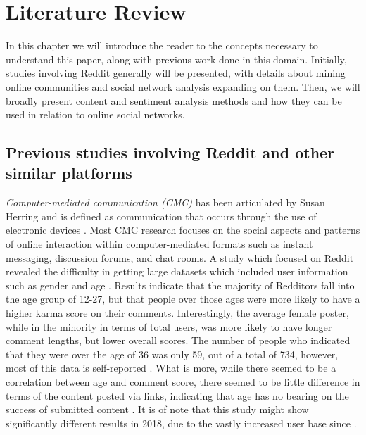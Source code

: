 \documentclass[bsc,frontabs,twoside,singlespacing,parskip,deptreport]{infthesis}
\begin{document}
\chapter{Literature Review}\label{background}
In this chapter we will introduce the reader to the concepts necessary to understand this paper, along with previous work done in this domain. Initially, studies involving Reddit generally will be presented, with details about mining online communities and social network analysis expanding on them. Then, we will broadly present content and sentiment analysis methods and how they can be used in relation to online social networks.

\section{Previous studies involving Reddit and other similar platforms}\label{previous-studies}

\textit{Computer-mediated communication (CMC)} has been articulated by Susan Herring and is defined as communication that occurs through the use of electronic devices \cite{HerringSusanC2004STtO}. Most CMC research focuses on the social aspects  and patterns of online interaction within computer-mediated formats such as instant messaging, discussion forums, and chat rooms. A study which focused on Reddit revealed the difficulty in getting large datasets which included user information such as gender and age \cite{FinlayS.Craig2014AaGi}. Results indicate that the majority of Redditors fall into the age group of 12-27, but that people over those ages were more likely to have a higher karma score on their comments. Interestingly, the average female poster, while in the minority in terms of total users, was more likely to have longer comment lengths, but lower overall scores. The number of people who indicated that they were over the age of 36 was only 59, out of a total of 734, however, most of this data is self-reported \cite{FinlayS.Craig2014AaGi}. What is more, while there seemed to be a correlation between age and comment score, there seemed to be little difference in terms of the content posted via links, indicating that age has no bearing on the success of submitted content \cite{FinlayS.Craig2014AaGi}. It is of note that this study might show significantly different results in 2018, due to the vastly increased user base since \cite{alexa} \cite{statista}.
\end{document}
